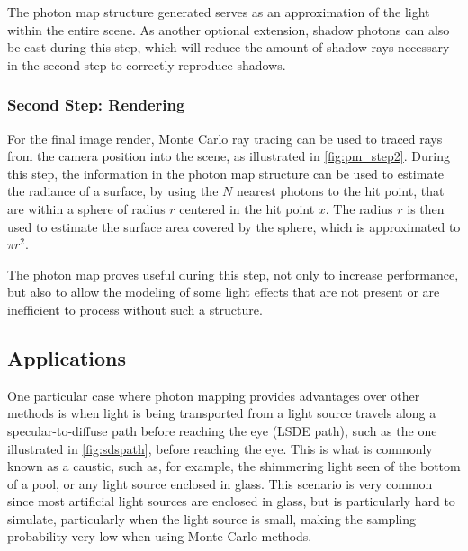\documentclass[main.tex]{subfiles}
\begin{document}
The photon map structure generated serves as an approximation of the light within the entire scene. As another optional extension, shadow photons can also be cast during this step, which will reduce the amount of shadow rays necessary in the second step to correctly reproduce shadows.


\subsubsection{Second Step: Rendering}

For the final image render, Monte Carlo ray tracing \cite{jensen2003monte} can be used to traced rays from the camera position into the scene, as illustrated in \cref{fig:pm_step2}. During this step, the information in the photon map structure can be used to estimate the radiance of a surface, by using the $N$ nearest photons to the hit point, that are within a sphere of radius $r$ centered in the hit point $x$. The radius $r$ is then used to estimate the surface area covered by the sphere, which is approximated to $\pi r^{2}$.

The photon map proves useful during this step, not only to increase performance, but also to allow the modeling of some light effects that are not present or are inefficient to process without such a structure.



\subsection{Applications}

One particular case where photon mapping provides advantages over other methods is when light is being transported from a light source travels along a specular-to-diffuse path before reaching the eye (LSDE path), such as the one illustrated in \cref{fig:sdspath}, before reaching the eye. This is what is commonly known as a caustic, such as, for example, the shimmering light seen of the bottom of a pool, or any light source enclosed in glass. This scenario is very common since most artificial light sources are enclosed in glass, but is particularly hard to simulate, particularly when the light source is small, making the sampling probability very low when using Monte Carlo methods.
\end{document}
